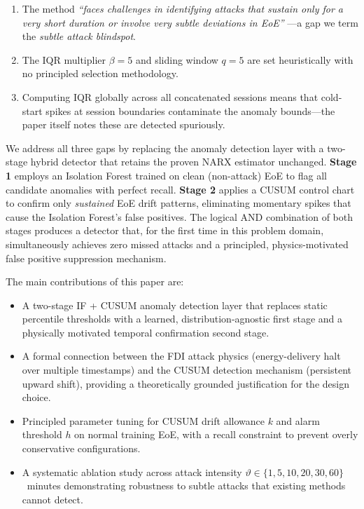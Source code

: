\documentclass[journal]{IEEEtran}
\newcommand{\cusum}{CUSUM}
\begin{document}
\begin{enumerate}
\item The method \emph{``faces challenges in identifying attacks that
sustain only for a very short duration or involve very subtle
deviations in EoE''} \cite{basumatary2025}---a gap we term the
\emph{subtle attack blindspot}.
\item The IQR multiplier $\beta=5$ and sliding window $q=5$ are set
heuristically with no principled selection methodology.
\item Computing IQR globally across all concatenated sessions means
that cold-start spikes at session boundaries contaminate the anomaly
bounds---the paper itself notes these are detected spuriously.
\end{enumerate}

We address all three gaps by replacing the anomaly detection layer
with a two-stage hybrid detector that retains the proven NARX estimator
unchanged. \textbf{Stage 1} employs an Isolation Forest
\cite{liu2008isolation} trained on clean (non-attack) EoE to flag
all candidate anomalies with perfect recall. \textbf{Stage 2} applies
a \cusum{} control chart \cite{page1954} to confirm only \emph{sustained}
EoE drift patterns, eliminating momentary spikes that cause the
Isolation Forest's false positives. The logical AND combination of
both stages produces a detector that, for the first time in this
problem domain, simultaneously achieves zero missed attacks and a
principled, physics-motivated false positive suppression mechanism.

The main contributions of this paper are:
\begin{itemize}
\item A two-stage IF + \cusum{} anomaly detection layer that replaces
static percentile thresholds with a learned, distribution-agnostic
first stage and a physically motivated temporal confirmation second
stage.
\item A formal connection between the FDI attack physics
(energy-delivery halt over multiple timestamps) and the CUSUM
detection mechanism (persistent upward shift), providing a
theoretically grounded justification for the design choice.
\item Principled parameter tuning for CUSUM drift allowance $k$ and
alarm threshold $h$ on normal training EoE, with a recall constraint
to prevent overly conservative configurations.
\item A systematic ablation study across attack intensity
$\vartheta \in \{1, 5, 10, 20, 30, 60\}$~minutes demonstrating
robustness to subtle attacks that existing methods cannot detect.
\end{itemize}
\end{document}

